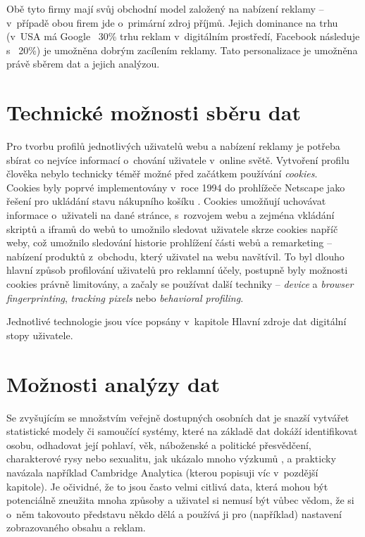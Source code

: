 Obě tyto firmy mají svůj obchodní model založený na nabízení reklamy -- v~případě obou firem jde o~primární zdroj příjmů. Jejich dominance na trhu (v~USA má Google ~30\% trhu reklam\citep{google-ads} v~digitálním prostředí, Facebook následuje s ~20\%) je umožněna dobrým zacílením reklamy. Tato personalizace je umožněna právě sběrem dat a jejich analýzou.

\section{Technické možnosti sběru dat}

Pro tvorbu profilů jednotlivých uživatelů webu a nabízení reklamy je potřeba sbírat co nejvíce informací o~chování uživatele v~online světě. Vytvoření profilu člověka nebylo technicky téměř možné před začátkem používání \textit{cookies}.\\
Cookies byly poprvé implementovány v~roce 1994 do prohlížeče Netscape jako řešení pro ukládání stavu nákupního košíku \citep{cookies-history}. Cookies umožňují uchovávat informace o~uživateli na dané stránce, s~rozvojem webu a zejména vkládání skriptů a iframů do webů to umožnilo sledovat uživatele skrze cookies napříč weby, což umožnilo sledování historie prohlížení části webů a remarketing -- nabízení produktů z~obchodu, který uživatel na webu navštívil\citep{scott-cookies}. To byl dlouho hlavní způsob profilování uživatelů pro reklamní účely, postupně byly možnosti cookies právně limitovány, a začaly se používat další techniky -- \textit{device} a \textit{browser fingerprinting}, \textit{tracking pixels} nebo \textit{behavioral profiling}.

Jednotlivé technologie jsou více popsány v~kapitole Hlavní zdroje dat digitální stopy uživatele.

\section{Možnosti analýzy dat}
Se zvyšujícím se množstvím veřejně dostupných osobních dat je snazší vytvářet statistické modely či samoučící systémy, které na základě dat dokáží identifikovat osobu, odhadovat její pohlaví, věk, náboženské a politické přesvědčení, charakterové rysy nebo sexualitu, jak ukázalo mnoho výzkumů \citep{big-5-predictions}, a prakticky navázala například Cambridge Analytica (kterou popisuji víc v~pozdější kapitole). Je očividné, že to jsou často velmi citlivá data, která mohou být potenciálně zneužita mnoha způsoby a uživatel si nemusí být vůbec vědom, že si o~něm takovouto představu někdo dělá a používá ji pro (například) nastavení zobrazovaného obsahu a reklam. 

